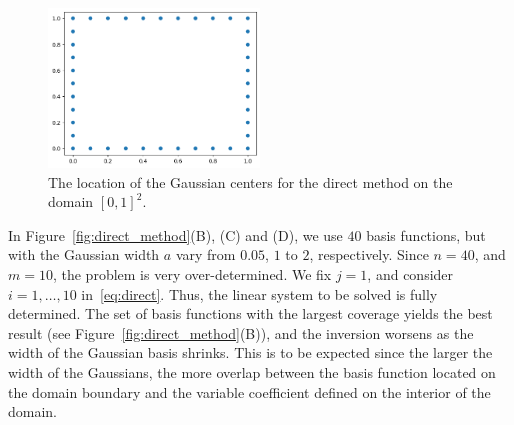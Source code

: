 \documentclass[12pt]{amsart}
\begin{document}
\begin{figure}
\centering
\includegraphics[width = 0.5\textwidth]{Figures/schrodinger_basis_loc.png}
    \caption{The location of the Gaussian centers for the direct method on the domain $[0,1]^2$.}\label{fig:centers}
\end{figure}

In Figure~\ref{fig:direct_method}(B), (C) and (D), we use $40$ basis functions, but with the Gaussian width $a$ vary from $0.05$, $1$ to $2$, respectively. Since $n = 40$, and $m = 10$, the problem is very over-determined. We fix $j=1$, and consider $i=1,\ldots, 10$ in~\eqref{eq:direct}. Thus, the linear system to be solved is fully determined. The set of basis functions with the largest coverage yields the best result (see Figure~\ref{fig:direct_method}(B)), and the inversion worsens as the width of the Gaussian basis shrinks. This is to be expected since the larger the width of the Gaussians, the more overlap between the basis function located on the domain boundary and the variable coefficient defined on the interior of the domain. 

\end{document}
